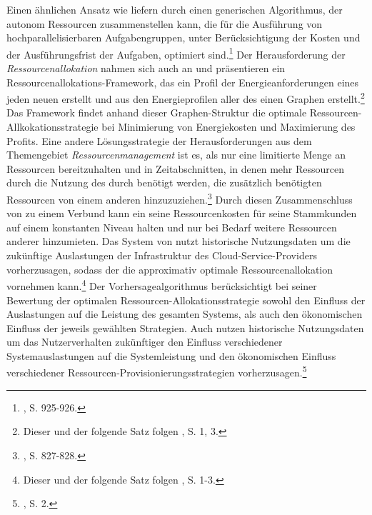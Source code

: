 \newline
Einen ähnlichen Ansatz wie \cite{Doulamis.2012} liefern \cite{GutierrezGarcia.2012} durch einen generischen Algorithmus, der autonom Ressourcen zusammenstellen kann, die für die Ausführung von hochparallelisierbaren Aufgabengruppen, unter Berücksichtigung der Kosten und der Ausführungsfrist der Aufgaben, optimiert sind.\footnote{\cite{GutierrezGarcia.2012}, S. 925-926.}
\newline
Der Herausforderung der \emph{Ressourcenallokation} nahmen sich auch \cite{Patel.2012} an und präsentieren ein Ressourcenallokations-Framework, das ein Profil der Energieanforderungen eines jeden neuen \CSUs erstellt und aus den Energieprofilen aller \CSU des \CSs einen Graphen erstellt.\footnote{Dieser und der folgende Satz folgen \cite{Patel.2012}, S. 1, 3.}
Das Framework findet anhand dieser Graphen-Struktur die optimale Ressourcen-Allkokationsstrategie bei Minimierung von Energiekosten und Maximierung des Profits.
\newline
Eine andere Lösungsstrategie der Herausforderungen aus dem Themengebiet \emph{Ressourcenmanagement} ist es,  als \CSP nur eine limitierte Menge an Ressourcen bereitzuhalten und in Zeitabschnitten, in denen mehr Ressourcen durch die Nutzung des \CSs durch \CSU benötigt werden, die zusätzlich benötigten Ressourcen von einem anderen \CSP hinzuzuziehen.\footnote{\cite{Goiri.2012}, S. 827-828.}
Durch diesen Zusammenschluss von \CSPn zu einem Verbund kann ein \CSP seine Ressourcenkosten für seine Stammkunden auf einem konstanten Niveau halten und nur bei Bedarf weitere Ressourcen anderer \CSP hinzumieten.
\newline
Das System von \cite{Hedwig.2012} nutzt historische Nutzungsdaten um die zukünftige Auslastungen der \CC Infrastruktur des Cloud-Service-\linebreak Providers vorherzusagen, sodass der \CSP die approximativ optimale Ressourcenallokation vornehmen kann.\footnote{Dieser und der folgende Satz folgen \cite{Hedwig.2012}, S. 1-3. }
Der Vorhersagealgorithmus berücksichtigt bei seiner Bewertung der optimalen Ressourcen-Allokationsstrategie sowohl den Einfluss der Auslastungen auf die Leistung des gesamten \CC Systems, als auch den ökonomischen Einfluss der jeweils gewählten Strategien. 
\newline
Auch \cite{Brandt.2012} nutzen historische Nutzungsdaten um das Nutzerverhalten zukünftiger \CSUComma den Einfluss verschiedener Systemauslastungen auf die Systemleistung und den ökonomischen Einfluss verschiedener Ressourcen-\linebreak Provisionierungsstrategien vorherzusagen.\footnote{\cite{Brandt.2012}, S. 2.}
